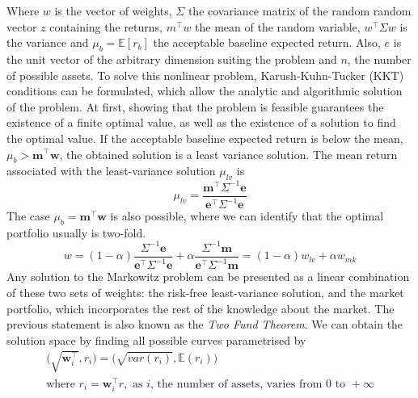 Where $w$ is the vector of weights, $\Sigma$ the covariance matrix of the random random vector $z$ containing the returns, $m^{\top}w$ the mean of the random variable, $w^{\top} \Sigma w $ is the variance and $\mu_b = \mathbb{E}[r_b]$ the acceptable baseline expected return. Also, $e$ is the unit vector of the arbitrary dimension suiting the problem and $n$, the number of possible assets. To solve this nonlinear problem, Karush-Kuhn-Tucker (KKT) conditions \cite{Kuhn_Tucker_2014} can be formulated, which allow the analytic and algorithmic solution of the problem. At first, showing that the problem is feasible guarantees the existence of a finite optimal value, as well as the existence of a solution to find the optimal value. If the acceptable baseline expected return is below the mean, $\mu_b > \bm{m}^{\top}\bm{w}$, the obtained solution is a least variance solution. The mean return associated with the least-variance solution $\mu_{lv}$ is
\begin{equation}%
	\mu_{lv} = \frac{\bm{m}^{\top} \Sigma^{-1}\bm{e}}{\bm{e}^{\top} \Sigma^{-1}\bm{e}}
\label{eq: mean return least-variance solution}
\end{equation}
The case $\mu_b = \bm{m}^{\top}\bm{w}$ is also possible, where we can identify that the optimal portfolio usually is two-fold. 
\begin{equation}%
	w = (1-\alpha) \frac{\Sigma^{-1}\bm{e}}{\bm{e}^{\top}\Sigma^{-1}\bm{e}} + \alpha \frac{\Sigma^{-1}\bm{m}}{\bm{e}^{\top}\Sigma^{-1}\bm{m}} = (1-\alpha)w_{lv} + \alpha w_{mk}
\label{eq: optimal distribution of weights}
\end{equation}
Any solution to the Markowitz problem can be presented as a linear combination of these two sets of weights: the risk-free least-variance solution, and the market portfolio, which incorporates the rest of the knowledge about the market. The previous statement is also known as the \textit{Two Fund Theorem}. We can obtain the solution space by finding all possible curves parametrised by 
\begin{subequations}%
	\label{eq:Solution space curves}
	\begin{align}
	\Big( \sqrt{\bm{w}_i^{\top}}, r_i \Big) = \Big( \sqrt{var(r_i)}, \mathbb{E}(r_i) \Big)        \label{eq:Solution space curve} \\
	\text{where } r_i = \bm{w}_i^{\top}r, \text{ as } i \text{, the number of assets, varies from } 0 \text{ to } +\infty         \label{eq:Solution space curve conditions}
	\end{align}
\end{subequations}
